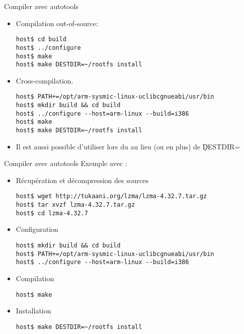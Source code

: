 \begin{frame}[fragile=singleslide]{Compiler avec autotools}
  \begin{itemize}
  \item  Compilation out-of-source:
    \begin{lstlisting}
host$ cd build
host$ ../configure
host$ make
host$ make DESTDIR=~/rootfs install
    \end{lstlisting} %
  \item  Cross-compilation.
    \begin{lstlisting}
host$ PATH+=/opt/arm-sysmic-linux-uclibcgnueabi/usr/bin
host$ mkdir build && cd build
host$ ../configure --host=arm-linux --build=i386
host$ make
host$ make DESTDIR=~/rootfs install
    \end{lstlisting} %
  \item  Il   est  aussi  possible  d'utiliser  lors du 
     au lieu (ou en plus) de \c{DESTDIR=}
  \end{itemize}
\end{frame}

\begin{frame}[fragile=singleslide]{Compiler avec autotools}
  Exemple avec :
  \begin{itemize}
  \item Récupération et décompression des sources
\begin{lstlisting}
host$ wget http://tukaani.org/lzma/lzma-4.32.7.tar.gz
host$ tar xvzf lzma-4.32.7.tar.gz
host$ cd lzma-4.32.7
\end{lstlisting} %
  \item Configuration
\begin{lstlisting}
host$ mkdir build && cd build
host$ PATH+=/opt/arm-sysmic-linux-uclibcgnueabi/usr/bin
host$ ../configure --host=arm-linux --build=i386
\end{lstlisting} %
  \item Compilation
\begin{lstlisting}
host$ make
\end{lstlisting} %
  \item Installation
\begin{lstlisting}
host$ make DESTDIR=~/rootfs install
\end{lstlisting} %
  \end{itemize}
\end{frame}

